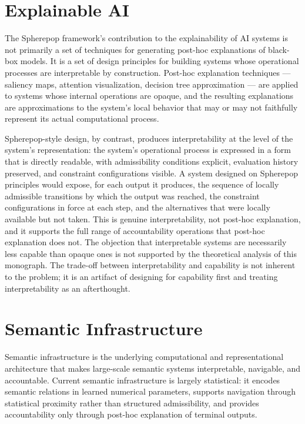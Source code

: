 \documentclass[12pt,openany]{book}
\theoremstyle{plain}
\theoremstyle{definition}
\theoremstyle{remark}
\begin{document}
\section{Explainable AI}

The Spherepop framework's contribution to the explainability of AI systems is not primarily a set of techniques for generating post-hoc explanations of black-box models. It is a set of design principles for building systems whose operational processes are interpretable by construction. Post-hoc explanation techniques — saliency maps, attention visualization, decision tree approximation — are applied to systems whose internal operations are opaque, and the resulting explanations are approximations to the system's local behavior that may or may not faithfully represent its actual computational process.

Spherepop-style design, by contrast, produces interpretability at the level of the system's representation: the system's operational process is expressed in a form that is directly readable, with admissibility conditions explicit, evaluation history preserved, and constraint configurations visible. A system designed on Spherepop principles would expose, for each output it produces, the sequence of locally admissible transitions by which the output was reached, the constraint configurations in force at each step, and the alternatives that were locally available but not taken. This is genuine interpretability, not post-hoc explanation, and it supports the full range of accountability operations that post-hoc explanation does not. The objection that interpretable systems are necessarily less capable than opaque ones is not supported by the theoretical analysis of this monograph. The trade-off between interpretability and capability is not inherent to the problem; it is an artifact of designing for capability first and treating interpretability as an afterthought.

\section{Semantic Infrastructure}

Semantic infrastructure is the underlying computational and representational architecture that makes large-scale semantic systems interpretable, navigable, and accountable. Current semantic infrastructure is largely statistical: it encodes semantic relations in learned numerical parameters, supports navigation through statistical proximity rather than structured admissibility, and provides accountability only through post-hoc explanation of terminal outputs.
\end{document}
